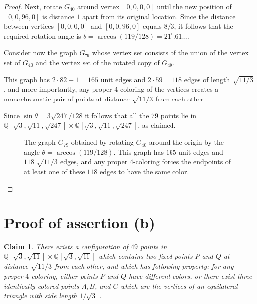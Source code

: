 \documentclass [11pt,oneside]{amsart}
\theoremstyle{definition}
\theoremstyle{plain}
\newtheorem{claim}[df]{Claim}
\begin{document}
\begin{proof}
Next, rotate $G_{40}$ around vertex $[0,0,0,0]$ until the new position of $[0,0,96,0]$ is distance $1$ apart from its original location. Since the distance between vertices $[0,0,0,0]$ and $[0,0,96,0]$ equals $8/3$, it follows that the required rotation angle is $\theta= \arccos(119/128)=21^{\circ}.61\ldots$.

Consider now the graph $G_{79}$ whose vertex set consists of the union of the vertex set of $G_{40}$ and the vertex set of the rotated copy of $G_{40}$.

This graph has $2\cdot 82+1=165$ unit edges and $2\cdot 59= 118$ edges of length $\sqrt{11/3}$, and more importantly, any proper $4$-coloring of the vertices creates a monochromatic pair of points at distance $\sqrt{11/3}$ from each other.

Since $\sin{\theta}=3\sqrt{247}/128$ it follows that all the $79$ points lie in $\mathbb{Q}[\sqrt{3}, \sqrt{11},\sqrt{247}]\times \mathbb{Q}[\sqrt{3}, \sqrt{11},\sqrt{247}]$, as claimed.

\begin{figure}[ht]
\centering
{}

\caption{The graph $G_{79}$ obtained by rotating $G_{40}$ around the origin by the angle $\theta=\arccos(119/128)$. This graph has $165$ unit edges and $118$ $\sqrt{11/3}$ edges, and any proper $4$-coloring forces the endpoints of at least one of these $118$ edges to have the same color.}
\label{G79drawing}
\end{figure}
\end{proof}

\section{\bf Proof of assertion (b)}

\begin{claim}\label{Claim2}
There exists a configuration of $49$ points in $\mathbb{Q}[\sqrt{3}, \sqrt{11}]\times \mathbb{Q}[\sqrt{3}, \sqrt{11}]$ which contains two fixed points $P$ and $Q$ at distance $\sqrt{11/3}$ from each other, and which has following property: for any proper $4$-coloring, either points $P$ and $Q$ have different colors, or there exist three identically colored points $A, B$, and $C$ which are the vertices of an equilateral triangle with side length $1/\sqrt{3}$ .
\end{claim}
\end{document}

